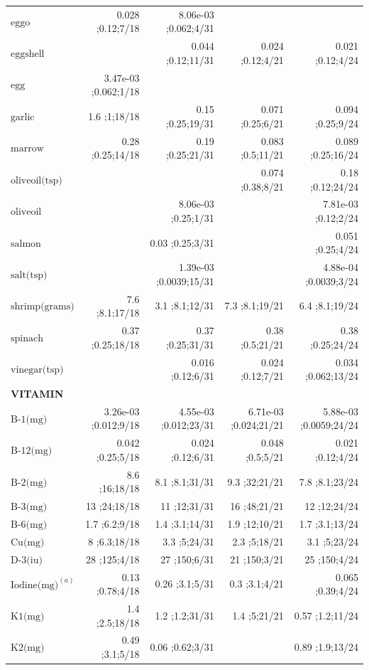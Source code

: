 \begin{table}[H]
\begin{tabular}{|l|r|r|r|r|}
$\textrm{eggo}$&0.028 ;0.12;7/18&8.06e-03 ;0.062;4/31&&\\
$\textrm{eggshell}$&&0.044 ;0.12;11/31&0.024 ;0.12;4/21&0.021 ;0.12;4/24\\
$\textrm{egg}$&3.47e-03 ;0.062;1/18&&&\\
$\textrm{garlic}$&1.6 ;1;18/18&0.15 ;0.25;19/31&0.071 ;0.25;6/21&0.094 ;0.25;9/24\\
$\textrm{marrow}$&0.28 ;0.25;14/18&0.19 ;0.25;21/31&0.083 ;0.5;11/21&0.089 ;0.25;16/24\\
$\textrm{oliveoil(tsp)}$&&&0.074 ;0.38;8/21&0.18 ;0.12;24/24\\
$\textrm{oliveoil}$&&8.06e-03 ;0.25;1/31&&7.81e-03 ;0.12;2/24\\
$\textrm{salmon}$&&0.03 ;0.25;3/31&&0.051 ;0.25;4/24\\
$\textrm{salt(tsp)}$&&1.39e-03 ;0.0039;15/31&&4.88e-04 ;0.0039;3/24\\
$\textrm{shrimp(grams)}$&7.6 ;8.1;17/18&3.1 ;8.1;12/31&7.3 ;8.1;19/21&6.4 ;8.1;19/24\\
$\textrm{spinach}$&0.37 ;0.25;18/18&0.37 ;0.25;31/31&0.38 ;0.5;21/21&0.38 ;0.25;24/24\\
$\textrm{vinegar(tsp)}$&&0.016 ;0.12;6/31&0.024 ;0.12;7/21&0.034 ;0.062;13/24\\
{\bf VITAMIN}&&&&\\
$\textrm{B-1(mg)}$&3.26e-03 ;0.012;9/18&4.55e-03 ;0.012;23/31&6.71e-03 ;0.024;21/21&5.88e-03 ;0.0059;24/24\\
$\textrm{B-12(mg)}$&0.042 ;0.25;5/18&0.024 ;0.12;6/31&0.048 ;0.5;5/21&0.021 ;0.12;4/24\\
$\textrm{B-2(mg)}$&8.6 ;16;18/18&8.1 ;8.1;31/31&9.3 ;32;21/21&7.8 ;8.1;23/24\\
$\textrm{B-3(mg)}$&13 ;24;18/18&11 ;12;31/31&16 ;48;21/21&12 ;12;24/24\\
$\textrm{B-6(mg)}$&1.7 ;6.2;9/18&1.4 ;3.1;14/31&1.9 ;12;10/21&1.7 ;3.1;13/24\\
$\textrm{Cu(mg)}$&8 ;6.3;18/18&3.3 ;5;24/31&2.3 ;5;18/21&3.1 ;5;23/24\\
$\textrm{D-3(iu)}$&28 ;125;4/18&27 ;150;6/31&21 ;150;3/21&25 ;150;4/24\\
$\textrm{Iodine(mg)}^{\left(a\right)}$&0.13 ;0.78;4/18&0.26 ;3.1;5/31&0.3 ;3.1;4/21&0.065 ;0.39;4/24\\
$\textrm{K1(mg)}$&1.4 ;2.5;18/18&1.2 ;1.2;31/31&1.4 ;5;21/21&0.57 ;1.2;11/24\\
$\textrm{K2(mg)}$&0.49 ;3.1;5/18&0.06 ;0.62;3/31&&0.89 ;1.9;13/24\\

\end{tabular}
\end{table}
